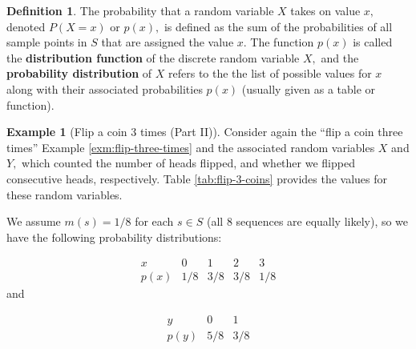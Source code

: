 \documentclass[
]{book}
\theoremstyle{definition}
\newtheorem{definition}{Definition}[chapter]
\theoremstyle{definition}
\newtheorem{example}{Example}[chapter]
\theoremstyle{definition}
\theoremstyle{definition}
\theoremstyle{remark}
\begin{document}
\begin{definition}
\protect\hypertarget{def:prob-distribution-discete-rv}{}\label{def:prob-distribution-discete-rv}The probability that a random variable \(X\) takes on value \(x,\) denoted \(P(X = x)\) or \(p(x),\) is defined as the sum of the probabilities of all sample points in \(S\) that are assigned the value \(x\). The function \(p(x)\) is called the \textbf{distribution function} of the discrete random variable \(X,\) and the \textbf{probability distribution} of \(X\) refers to the the list of possible values for \(x\) along with their associated probabilities \(p(x)\) (usually given as a table or function).
\end{definition}

\begin{example}[Flip a coin 3 times (Part II)]
\protect\hypertarget{exm:flip-three-times-probs}{}\label{exm:flip-three-times-probs}Consider again the ``flip a coin three times'' Example \ref{exm:flip-three-times} and the associated random variables \(X\) and \(Y,\) which counted the number of heads flipped, and whether we flipped consecutive heads, respectively. Table \ref{tab:flip-3-coins} provides the values for these random variables.

We assume \(m(s) = 1/8\) for each \(s \in S\) (all 8 sequences are equally likely), so we have the following probability distributions:

\[
\begin{array}{c|c|c|c|c}
x & 0 & 1 & 2 & 3 \\ \hline
p(x) & 1/8 & 3/8 & 3/8 & 1/8 
\end{array}
\]
and

\[
\begin{array}{c|c|c}
y & 0 & 1  \\ \hline
p(y) & 5/8 & 3/8  
\end{array}
\]
\end{example}
\end{document}
